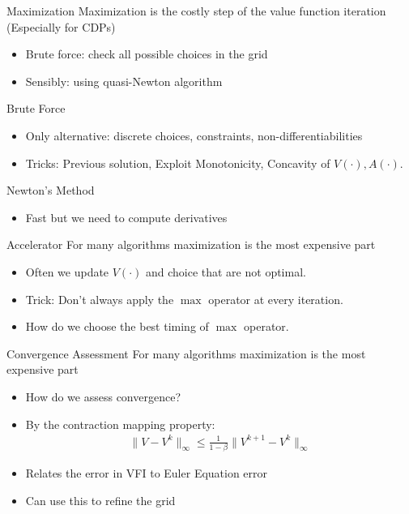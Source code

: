 \documentclass[aspectratio=169,11pt]{beamer}
\begin{document}
\begin{frame}{Maximization}
Maximization is the costly step of the value function iteration (Especially for CDPs)
\begin{itemize}
\item Brute force: check all possible choices in the grid
\item Sensibly: using quasi-Newton algorithm
\end{itemize}
Brute Force
\begin{itemize}
\item Only alternative: discrete choices, constraints, non-differentiabilities
\item Tricks: Previous solution, Exploit Monotonicity, Concavity of $V(\cdot), A(\cdot)$.
\end{itemize}
Newton's Method
\begin{itemize}
\item Fast but we need to compute derivatives
\end{itemize}
\end{frame}

\begin{frame}{Accelerator}
For many algorithms maximization is the most expensive part
\begin{itemize}
\item Often we update $V(\cdot)$ and choice that are not optimal.
\item Trick: Don't always apply the $\max$ operator at every iteration.
\item How do we choose the best timing of $\max$ operator.
\end{itemize}
\end{frame}


\begin{frame}{Convergence Assessment}
For many algorithms maximization is the most expensive part
\begin{itemize}
\item How do we assess convergence?
\item By the contraction mapping property: 
\begin{eqnarray*}
\|V-V^k\|_{\infty} \leq \frac{1}{1-\beta} \|V^{k+1} - V^{k} \|_{\infty}
\end{eqnarray*}
\item Relates the error in VFI to Euler Equation error
\item Can use this to refine the grid
\end{itemize}
\end{frame}
\end{document}

